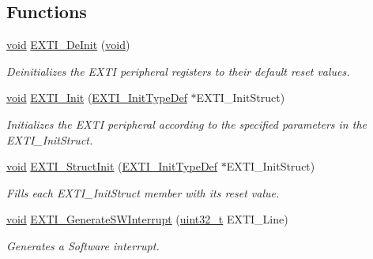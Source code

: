 \subsection*{Functions}
\begin{DoxyCompactItemize}
\item 
\hyperlink{usb__devapi_8h_afabf60e7f57651d6d595a02c75f07cd0}{void} \hyperlink{group___e_x_t_i___exported___functions_ga07072e339cb9ecb9cd9d4b94afc9f317}{E\+X\+T\+I\+\_\+\+De\+Init} (\hyperlink{usb__devapi_8h_afabf60e7f57651d6d595a02c75f07cd0}{void})
\begin{DoxyCompactList}\small\item\em Deinitializes the E\+X\+TI peripheral registers to their default reset values. \end{DoxyCompactList}\item 
\hyperlink{usb__devapi_8h_afabf60e7f57651d6d595a02c75f07cd0}{void} \hyperlink{group___e_x_t_i___exported___functions_ga8c9ce6352a3a2dfc8fc9287cb24c6501}{E\+X\+T\+I\+\_\+\+Init} (\hyperlink{struct_e_x_t_i___init_type_def}{E\+X\+T\+I\+\_\+\+Init\+Type\+Def} $\ast$E\+X\+T\+I\+\_\+\+Init\+Struct)
\begin{DoxyCompactList}\small\item\em Initializes the E\+X\+TI peripheral according to the specified parameters in the E\+X\+T\+I\+\_\+\+Init\+Struct. \end{DoxyCompactList}\item 
\hyperlink{usb__devapi_8h_afabf60e7f57651d6d595a02c75f07cd0}{void} \hyperlink{group___e_x_t_i___exported___functions_ga86b9e662d18a2f829999cfb26aa7ca20}{E\+X\+T\+I\+\_\+\+Struct\+Init} (\hyperlink{struct_e_x_t_i___init_type_def}{E\+X\+T\+I\+\_\+\+Init\+Type\+Def} $\ast$E\+X\+T\+I\+\_\+\+Init\+Struct)
\begin{DoxyCompactList}\small\item\em Fills each E\+X\+T\+I\+\_\+\+Init\+Struct member with its reset value. \end{DoxyCompactList}\item 
\hyperlink{usb__devapi_8h_afabf60e7f57651d6d595a02c75f07cd0}{void} \hyperlink{group___e_x_t_i___exported___functions_ga897e8ea59f40a19e047fb9994876fc9b}{E\+X\+T\+I\+\_\+\+Generate\+S\+W\+Interrupt} (\hyperlink{_p_e___types_8h_a33594304e786b158f3fb30289278f5af}{uint32\+\_\+t} E\+X\+T\+I\+\_\+\+Line)
\begin{DoxyCompactList}\small\item\em Generates a Software interrupt. \end{DoxyCompactList}\item 

\end{DoxyCompactItemize}

